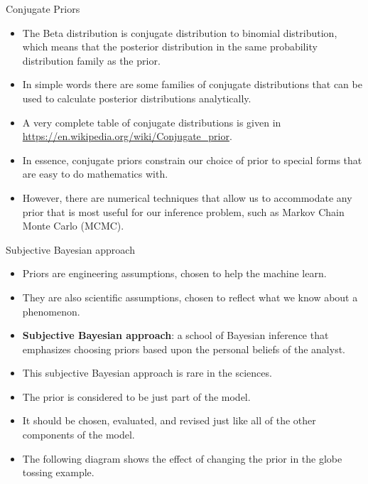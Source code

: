 \documentclass[handout]{beamer}
\begin{document}
\begin{frame}{Conjugate Priors}
\scriptsize{

\begin{itemize}
\item The Beta distribution is conjugate distribution to binomial distribution, which means that the posterior distribution in the same probability distribution family as the prior.

\item In simple words there are some families of conjugate distributions that can be used to calculate posterior distributions analytically.

\item A very complete table of conjugate distributions is given in \url{https://en.wikipedia.org/wiki/Conjugate_prior}.

\item In essence, conjugate priors constrain our choice of prior to special forms that are easy to do mathematics with.

\item However, there are numerical techniques that allow us to accommodate any prior that is most useful for our inference problem, such as Markov Chain Monte Carlo (MCMC).

\end{itemize}

} 

\end{frame}





\begin{frame}{Subjective Bayesian approach}
\scriptsize{

\begin{itemize}
\item Priors are engineering assumptions, chosen to help the machine learn.
\item They are also  scientific assumptions, chosen to reflect what we know about a phenomenon.
\item \textbf{Subjective Bayesian approach}:  a school of Bayesian inference that emphasizes choosing priors based upon the personal beliefs of the analyst. 
\item This subjective Bayesian approach is rare in the sciences.
\item The prior is considered to be just part of the model.
\item It should be chosen, evaluated, and revised just like all of the other components of the model.
\item The following diagram shows the effect of changing the prior in the globe tossing example.




\end{itemize}

} 

\end{frame}
\end{document}
